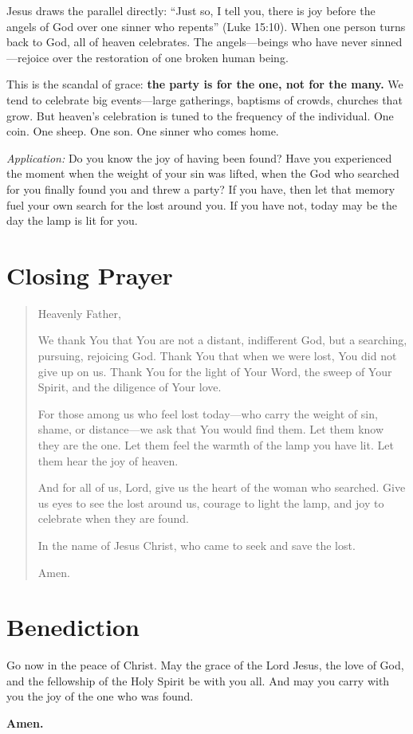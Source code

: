 \documentclass[
    language=english,
    doctype=sermon,
    institution=none,
]{../../omnilatex}
\begin{document}
Jesus draws the parallel directly: ``Just so, I tell you, there is joy before the angels of God over one sinner who repents'' (Luke 15:10). When one person turns back to God, all of heaven celebrates. The angels---beings who have never sinned---rejoice over the restoration of one broken human being.

This is the scandal of grace: \textbf{the party is for the one, not for the many.} We tend to celebrate big events---large gatherings, baptisms of crowds, churches that grow. But heaven's celebration is tuned to the frequency of the individual. One coin. One sheep. One son. One sinner who comes home.

\bigskip
\noindent\textit{Application:} Do you know the joy of having been found? Have you experienced the moment when the weight of your sin was lifted, when the God who searched for you finally found you and threw a party? If you have, then let that memory fuel your own search for the lost around you. If you have not, today may be the day the lamp is lit for you.

\section{Closing Prayer}

\begin{quote}
Heavenly Father,

We thank You that You are not a distant, indifferent God, but a searching, pursuing, rejoicing God. Thank You that when we were lost, You did not give up on us. Thank You for the light of Your Word, the sweep of Your Spirit, and the diligence of Your love.

For those among us who feel lost today---who carry the weight of sin, shame, or distance---we ask that You would find them. Let them know they are the one. Let them feel the warmth of the lamp you have lit. Let them hear the joy of heaven.

And for all of us, Lord, give us the heart of the woman who searched. Give us eyes to see the lost around us, courage to light the lamp, and joy to celebrate when they are found.

In the name of Jesus Christ, who came to seek and save the lost.

Amen.
\end{quote}

\section{Benediction}

Go now in the peace of Christ. May the grace of the Lord Jesus, the love of God, and the fellowship of the Holy Spirit be with you all. And may you carry with you the joy of the one who was found.

\textbf{Amen.}
\end{document}

